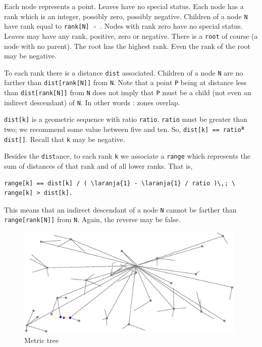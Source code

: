 Each node represents a point.
Leaves have no special status.
Each node has a rank which is an integer, possibly zero, possibly negative.
Children of a node {\small\tt N} have rank equal to {\small\tt rank[N] - }.
Nodes with rank zero have no special status.
Leaves may have any rank, positive, zero or negative.
There is a {\small\tt root} of course (a node with no parent).
The root has the highest rank.
Even the rank of the root may be negative.

To each rank there is a distance {\small\tt dist} associated.
Children of a node {\small\tt N} are no farther than {\small\tt dist[rank[N]]} from {\small\tt N}.
Note that a point {\small\tt P} being at distance less than {\small\tt dist[rank[N]]} from
{\small\tt N} does not imply that {\small\tt P} must be a child (not even an indirect descendant)
of {\small\tt N}.
In other words : zones overlap.

{\small\tt dist[k]} is a geometric sequence with ratio {\small\tt ratio}.
{\small\tt ratio} must be greater than two; we recommend some value between five and ten.
So, {\small\tt dist[k] == ratio}$^{\hbox{\footnotesize\tt k }}${\small\tt dist[]}.
Recall that {\small\tt k} may be negative.

Besides the {\small\tt dist}ance, to each rank {\small\tt k} we associate a {\small\tt range}
which represents the sum of distances of that rank and of all lower ranks.
That is,
\begin{Verbatim}[commandchars=\\\{\},formatcom=\small\tt,baselinestretch=0.94]
   range[k] == dist[k] / ( \laranja{1} - \laranja{1} / ratio )\,; \ range[k] > dist[k].
\end{Verbatim}
\noindent This means that an indirect descendant of a node {\small\tt N} cannot be farther than
{\small\tt range[rank[N]]} from {\small\tt N}.
Again, the reverse may be false.

\begin{figure}[ht] \centering
  \includegraphics[width=110mm]{metric-tree}
  \caption{Metric tree}
  \label{\numb section 12.\numb fig 9}
\end{figure}

